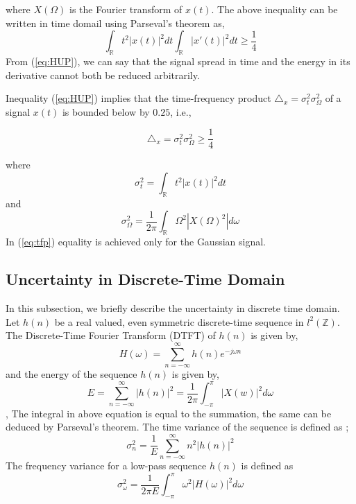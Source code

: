 where $X(\Omega)$ is the Fourier transform of $x(t)$. The above inequality can be written in time domail using Parseval's theorem as,
\begin{equation}
\int_{\mathbb{R}}t^{2}|x(t)|^{2}dt\int_{\mathbb{R}}|x'(t)|^{2}dt\ge\frac{1}{4}\label{eq:HUP}
\end{equation}
From (\ref{eq:HUP}), we can say that the signal spread in time and the
energy in its derivative cannot both be reduced arbitrarily.

Inequality (\ref{eq:HUP}) implies that the time-frequency product $\triangle_{x}=\sigma_{t}^{2}\sigma_{\Omega}^{2}$
of a signal $x(t)$ is bounded below by $0.25$, i.e.,

\begin{equation}
\triangle_{x}=\sigma_{t}^{2}\sigma_{\Omega}^{2}\ge\frac{1}{4}\label{eq:tfp}\end{equation}


where 
\begin{equation*}
\label{eq: sigma_t_square}
\sigma_{t}^{2}=\int_{\mathbb{R}}t^{2}\left|x\left(t\right)\right|^{2}dt
\end{equation*}
and 
\begin{equation*}
\label{eq: sigma_w_square}
\sigma_{\Omega}^{2}=\frac{1}{2\pi}\int_{\mathbb{R}}\Omega^{2}|X(\Omega)^{2}|d\omega
\end{equation*}
 In (\ref{eq:tfp}) equality is achieved only for the Gaussian signal.

\subsection{\label{sub:Uncertainty-in-discrete}Uncertainty in Discrete-Time Domain}
In this subsection, we briefly describe the uncertainty in discrete time domain. 
Let $h(n)$ be a real valued, even symmetric discrete-time sequence in $l^{2}\left(\mathbb{Z}\right)$. 
The Discrete-Time Fourier Transform (DTFT) of $h(n)$ is given by,
\begin{equation}
H\left(\omega\right)=\sum_{n=-\infty}^{\infty}h\left(n\right)e^{-j\omega n}\label{eq:DTFT}\end{equation} 
and the energy of the sequence $h(n)$ is given by,
$$E = \sum_{n=-\infty}^{\infty}\left|h\left(n\right)\right|^{2} = \frac{1}{2\pi}\int_{-\pi}^{\pi}|X(w)|^2d\omega$$,
The integral in above equation is equal to the summation, the same can be deduced by Parseval's theorem.
The time variance of the sequence is defined as \cite{key-11, key-36}; 
\begin{equation}
\sigma_{n}^{2}=\frac{1}{E}\sum_{n=-\infty}^{\infty}n^{2}\left|h\left(n\right)\right|^{2}\label{eq:time_var}
\end{equation}
The frequency variance for a low-pass sequence $h\left(n\right)$ is defined
as \cite{key-11,key-36}
\begin{equation}
\sigma_{\omega}^{2}=\frac{1}{2\pi{E}}\int_{-\pi}^{\pi}\omega^{2}\left|H\left(\omega\right)\right|^{2}d\omega\label{eq:frequency_var}
\end{equation}

